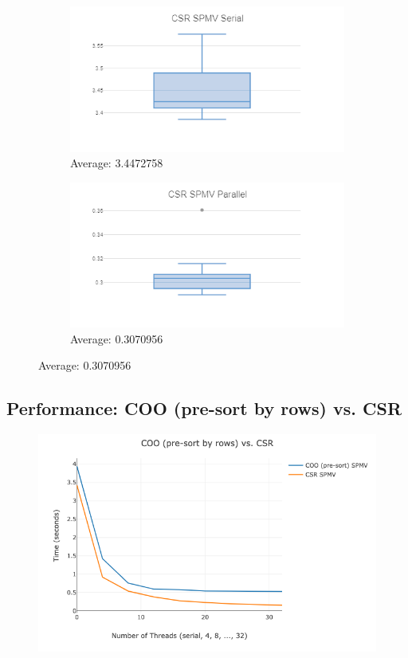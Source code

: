 \documentclass[a4paper,11pt,BCOR10mm,oneside,headsepline]{scrartcl}
\begin{document}
		\begin{figure}[!htbp]
			\begin{subfigure}{.5\textwidth}
				\centering
				\includegraphics[scale = 0.5]{./figures/csr_serial}
				\caption{Average: 3.4472758}
			\end{subfigure}
			\begin{subfigure}{.5\textwidth}
				\centering
				\includegraphics[scale = 0.5]{./figures/csr_parallel}
				\caption{Average: 0.3070956}
			\end{subfigure}
		\end{figure}
	
	\subsection{Performance: COO (pre-sort by rows) vs. CSR}
		\begin{figure}[!htbp]
			\centering
			\includegraphics[scale=0.45]{./figures/coo_vs_csr}
		\end{figure}
	
\end{document}
